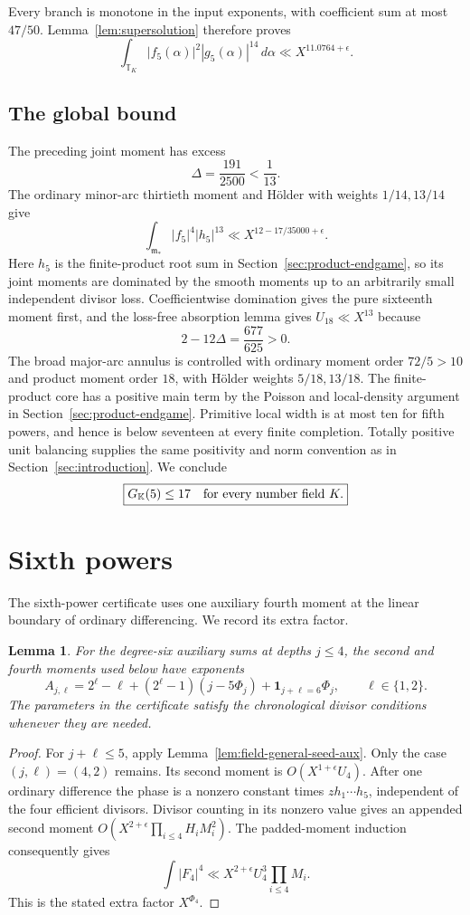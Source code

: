 \documentclass[11pt]{amsart}
\newtheorem{lemma}[theorem]{Lemma}
\theoremstyle{definition}
\numberwithin{equation}{section}
\begin{document}
Every branch is monotone in the input exponents, with coefficient
sum at most $47/50$. Lemma~\ref{lem:supersolution} therefore proves
\[
 \int_{\mathbb T_K}|f_5(\alpha)|^2|g_5(\alpha)|^{14}\,d\alpha
 \ll X^{11.0764+\epsilon}.
\]

\subsection{The global bound}
\label{sec:k5-global}
The preceding joint moment has excess
\[
 \Delta=\frac{191}{2500}<\frac1{13}.
\]
The ordinary minor-arc thirtieth moment and H\"older with weights
$1/14,13/14$ give
\[
 \int_{\mathfrak m_*}|f_5|^4|h_5|^{13}
 \ll X^{12-17/35000+\epsilon}.
\]
Here $h_5$ is the finite-product root sum in Section~\ref{sec:product-endgame}, so its
joint moments are dominated by the smooth moments up to an arbitrarily
small independent divisor loss.  Coefficientwise domination gives the
pure sixteenth moment first, and the loss-free absorption lemma gives
$U_{18}\ll X^{13}$ because
\[
 2-12\Delta=\frac{677}{625}>0.
\]
The broad major-arc annulus is controlled with ordinary moment order
$72/5>10$ and product moment order $18$, with H\"older weights $5/18,13/18$.
The finite-product core has a positive main term by the Poisson and
local-density argument in Section~\ref{sec:product-endgame}.  Primitive local width is at most ten
for fifth powers, and hence is below seventeen at every finite completion.
Totally positive unit balancing supplies the same positivity and norm
convention as in Section~\ref{sec:introduction}.  We conclude
\[
 \boxed{G_{\mathbb K}(5)\le17\quad\hbox{for every number field }K.}
\]

\section{Sixth powers}
\label{sec:sixth-powers}
The sixth-power certificate uses one auxiliary fourth moment at the
linear boundary of ordinary differencing. We record its extra factor.

\begin{lemma}\label{lem:sixth-linear-boundary}
For the degree-six auxiliary sums at depths $j\le4$, the second and
fourth moments used below have exponents
\[
 A_{j,\ell}=2^\ell-\ell+(2^\ell-1)(j-5\Phi_j)
                  +\mathbf1_{j+\ell=6}\Phi_j,
 \qquad \ell\in\{1,2\}.
\]
The parameters in the certificate satisfy the chronological divisor
conditions whenever they are needed.
\end{lemma}
\begin{proof}
For $j+\ell\le5$, apply Lemma~\ref{lem:field-general-seed-aux}.
Only the case $(j,\ell)=(4,2)$ remains. Its second moment is
$O(X^{1+\epsilon}U_4)$. After one ordinary difference the phase is
a nonzero constant times $zh_1\cdots h_5$, independent of the
four efficient divisors. Divisor counting in its nonzero value
gives an appended second moment
$O(X^{2+\epsilon}\prod_{i\le4}H_iM_i^2)$.
The padded-moment induction consequently gives
\[
 \int|F_4|^4\ll X^{2+\epsilon}U_4^3\prod_{i\le4}M_i.
\]
This is the stated extra factor $X^{\Phi_4}$.
\end{proof}
\end{document}
